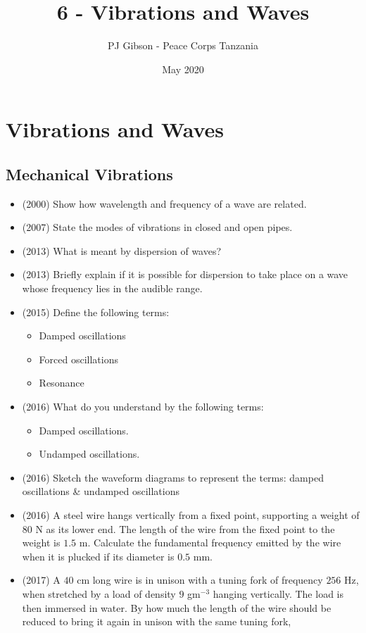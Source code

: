 \documentclass{article}
\title{\textbf{6 - Vibrations and Waves}}
\author{PJ Gibson - Peace Corps Tanzania}
\date{May 2020}
\newcommand{\mysection}[2]{\setcounter{section}{#1}\addtocounter{section}{-1}\section{#2}}
\begin{document}
\maketitle


\mysection{6}{Vibrations and Waves}

\subsection{Mechanical Vibrations}
\begin{itemize}
\item (2000)  Show how wavelength and frequency of a wave are related.
\item (2007)  State the modes of vibrations in closed and open pipes.  
\item (2013)  What is meant by dispersion of waves? 
\item (2013)  Briefly explain if it is possible for dispersion to take place on a wave whose frequency lies in the audible range.
\item (2015)  Define the following terms:
 \begin{itemize}
\item Damped oscillations
\item Forced oscillations
\item Resonance
\end{itemize}
\item (2016)  What do you understand by the following terms: 
 \begin{itemize}
\item Damped oscillations. 
\item Undamped oscillations.
\end{itemize}
\item (2016)  Sketch the waveform diagrams to represent the terms: damped oscillations & undamped oscillations
\item (2016)  A steel wire hangs vertically from a fixed point, supporting a weight of $ 80$ N as its lower end.  The length of the wire from the fixed point to the weight is $ 1.5$ m.  Calculate the fundamental frequency emitted by the wire when it is plucked if its diameter is $ 0.5$ mm. 
\item (2017)  A $ 40$ cm long wire is in unison with a tuning fork of frequency $ 256$ Hz, when stretched by a load of density $ 9$ gm$ ^{-3}$ hanging vertically. The load is then immersed in water. By how much the length of the wire should be reduced to bring it again in unison with the same tuning fork,
\end{itemize}
\end{document}
